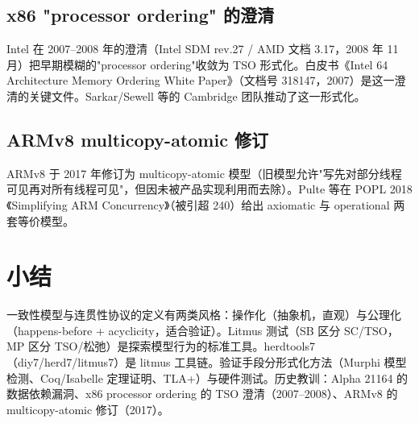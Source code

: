 \subsection{x86 "processor ordering" 的澄清}

Intel 在 2007–2008 年的澄清（Intel SDM rev.27 / AMD 文档 3.17，2008 年 11 月）把早期模糊的"processor ordering"收敛为 TSO 形式化。白皮书《Intel 64 Architecture Memory Ordering White Paper》（文档号 318147，2007）是这一澄清的关键文件。Sarkar/Sewell 等的 Cambridge 团队推动了这一形式化。

\subsection{ARMv8 multicopy-atomic 修订}

ARMv8 于 2017 年修订为 multicopy-atomic 模型（旧模型允许"写先对部分线程可见再对所有线程可见"，但因未被产品实现利用而去除）。Pulte 等在 POPL 2018《Simplifying ARM Concurrency》（被引超 240）给出 axiomatic 与 operational 两套等价模型。

\section{小结}

一致性模型与连贯性协议的定义有两类风格：操作化（抽象机，直观）与公理化（happens-before + acyclicity，适合验证）。Litmus 测试（SB 区分 SC/TSO，MP 区分 TSO/松弛）是探索模型行为的标准工具。herdtools7（diy7/herd7/litmus7）是 litmus 工具链。验证手段分形式化方法（Murphi 模型检测、Coq/Isabelle 定理证明、TLA+）与硬件测试。历史教训：Alpha 21164 的数据依赖漏洞、x86 processor ordering 的 TSO 澄清（2007–2008）、ARMv8 的 multicopy-atomic 修订（2017）。

